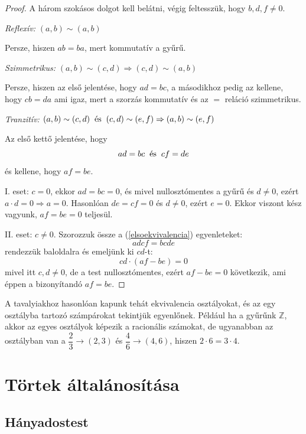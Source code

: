\documentclass[12pt]{book}
\theoremstyle{plain} %
\theoremstyle{definition} %
\theoremstyle{remark}
\numberwithin{equation}{section}  %
\begin{document}
	\begin{proof}
		A három szokásos dolgot kell belátni, végig feltesszük, hogy $b,d,f\neq 0$.
		
		\textit{Reflexív:} $(a,b)\sim (a,b)$
		
		Persze, hiszen $ab = ba$, mert kommutatív a gyűrű.
		
		\textit{Szimmetrikus:} $(a,b) \sim (c,d) \Rightarrow (c,d)\sim (a,b)$
		
		Persze, hiszen az első jelentése, hogy $ad=bc$, a másodikhoz pedig az kellene, hogy $cb=da$ ami igaz, mert a szorzás kommutatív és az $=$ reláció szimmetrikus.
		
		\textit{Tranzitív:} $(a,b)\sim (c,d) \hspace{2mm} \text{és} \hspace{2mm} (c,d)\sim (e,f) \Rightarrow (a,b)\sim (e,f)$
		
		Az első kettő jelentése, hogy
		\begin{equation}\label{elsoekvivalencia}
			ad = bc  \hspace{2mm} \text{és} \hspace{2mm} cf=de 
		\end{equation}
		és kellene, hogy $af=be$.
		
		I. eset: $c=0$, ekkor $ad=bc=0$, és mivel nullosztómentes a gyűrű és $d\neq 0$, ezért $a\cdot d = 0 \Rightarrow a=0$. Hasonlóan $de=cf=0$ és $d\neq 0$, ezért $e = 0$. Ekkor viszont kész vagyunk, $af=be=0$ teljesül.
		
		II. eset: $c\neq 0$. Szorozzuk össze a (\ref{elsoekvivalencia}) egyenleteket:
		\[ adcf=bcde  \]
		rendezzük baloldalra és emeljünk ki $cd$-t:
		\[ cd\cdot (af-be) = 0  \]
		mivel itt $c,d\neq 0$, de a test nullosztómentes, ezért $af-be = 0$ következik, ami éppen a bizonyítandó $af=be$.

	\end{proof}
	
	A tavalyiakhoz hasonlóan kapunk tehát ekvivalencia osztályokat, és az egy osztályba tartozó számpárokat tekintjük egyenlőnek. Például ha a gyűrűnk $\mathbb{Z}$, akkor az egyes osztályok képezik a racionális számokat, de ugyanabban az osztályban van a $\dfrac{2}{3} \rightarrow (2,3)$ és $\dfrac{4}{6} \rightarrow (4,6)$, hiszen $2\cdot 6 = 3\cdot 4$.
	
	\chapter{Törtek általánosítása}
	\section{Hányadostest}
	
\end{document}
